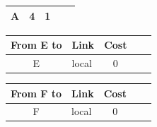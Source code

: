 \begin{enumerate}
\begin{enumerate}
\begin{table}[H]
\begin{tabular}{@{}clcll@{}}
                A                    & 4                        & 1                    \\ \bottomrule
            \end{tabular}
            \hfill
            \begin{tabular}{@{}clcll@{}}
                \toprule
                From E to            & \multicolumn{1}{c}{Link} & Cost                 \\ \midrule
                E                    & local                    & 0                    \\ \bottomrule
            \end{tabular}
            \hfill
            \begin{tabular}{@{}clcll@{}}
                \toprule
                From F to            & \multicolumn{1}{c}{Link} & Cost                 \\ \midrule
                F                    & local                    & 0                    \\ \bottomrule
            \end{tabular}
        \end{table}


\end{enumerate}
\end{enumerate}
